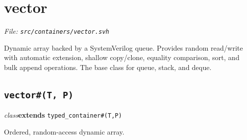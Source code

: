 \documentclass[11pt,letterpaper]{report}
\begin{document}
\section{vector}
\noindent\small\textit{File: \texttt{src/containers/vector.svh}}\par

Dynamic array backed by a SystemVerilog queue. Provides random read/write with automatic extension, shallow copy/clone, equality comparison, sort, and bulk append operations. The base class for queue, stack, and deque.

\subsection*{\texttt{vector\#(T, P)}}
\noindent\small\textit{class}\quad \textbf{extends} \texttt{typed\_container\#(T,P)}\par

Ordered, random-access dynamic array.
\end{document}
